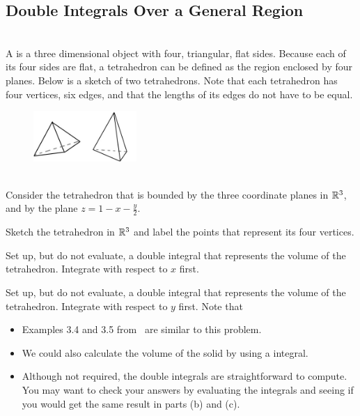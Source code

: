 \EEN %
\subsection{Double Integrals Over a General Region}

\BEN
\item %
 \\
A  is a three dimensional object with four, triangular, flat sides. Because each of its four sides are flat, a tetrahedron can be defined as the region enclosed by four planes. Below is a sketch of two tetrahedrons. Note that each tetrahedron has four vertices, six edges, and that the lengths of its edges do not have to be equal.
\begin{figure}[h]
  \vspace{-1pt}
  \begin{center}
    \includegraphics[width=0.35\textwidth]{ImgTetrahedrons.jpg}
  \end{center}
\end{figure}\\
Consider the tetrahedron that is bounded by the three coordinate planes in $\mathbb{R}^3$, and by the plane $z = 1 - x - \frac{y}{2}$.
\BEN
\item Sketch the tetrahedron in $\mathbb{R}^3$ and label the points that represent its four vertices. 
\item Set up, but do not evaluate, a double integral that represents the volume of the tetrahedron. Integrate with respect to $x$ first. 
\item Set up, but do not evaluate, a double integral that represents the volume of the tetrahedron. Integrate with respect to $y$ first. 
\EEN
Note that
\begin{itemize}
\item Examples 3.4 and 3.5 from \VCT \ are similar to this problem. 
\item We could also calculate the volume of the solid by using a  integral. 
\item Although not required, the double integrals are straightforward to compute. You may want to check your answers by evaluating the integrals and seeing if you would get the same result in parts (b) and (c). 
\end{itemize}
